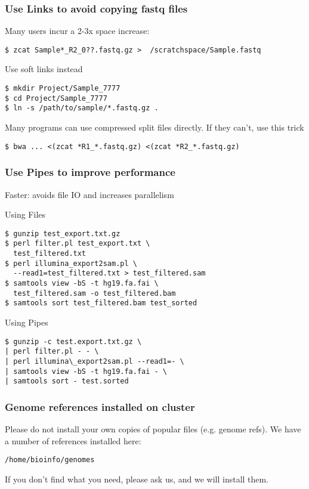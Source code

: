 \documentclass[10pt]{beamer}
\begin{document}
\begin{frame}[fragile]
\frametitle{Use Links to avoid copying fastq files}
Many users incur a 2-3x space increase:

\begin{verbatim}
$ zcat Sample*_R2_0??.fastq.gz >  /scratchspace/Sample.fastq
\end{verbatim}

Use soft links instead
\begin{verbatim}
$ mkdir Project/Sample_7777
$ cd Project/Sample_7777
$ ln -s /path/to/sample/*.fastq.gz .
\end{verbatim}

Many programs can use compressed split files directly.  If they can't, use this trick
\begin{verbatim}
$ bwa ... <(zcat *R1_*.fastq.gz) <(zcat *R2_*.fastq.gz) 
\end{verbatim}
\end{frame}

\begin{frame}[fragile]
\frametitle{Use Pipes to improve performance}

\vskip10pt
Faster: avoids file IO and increases parallelism

\vskip10pt
Using Files
\begin{verbatim}
$ gunzip test_export.txt.gz 
$ perl filter.pl test_export.txt \
  test_filtered.txt
$ perl illumina_export2sam.pl \
  --read1=test_filtered.txt > test_filtered.sam
$ samtools view -bS -t hg19.fa.fai \
  test_filtered.sam -o test_filtered.bam
$ samtools sort test_filtered.bam test_sorted
\end{verbatim}

Using Pipes
\begin{verbatim}
$ gunzip -c test.export.txt.gz \
| perl filter.pl - - \
| perl illumina\_export2sam.pl --read1=- \
| samtools view -bS -t hg19.fa.fai - \
| samtools sort - test.sorted
\end{verbatim}
\end{frame}

\begin{frame}[fragile]
\frametitle{Genome references installed on cluster}

Please do not install your own copies of popular files (e.g. genome refs).  
\vskip10pt
We have a number of references installed here:
\begin{verbatim}
/home/bioinfo/genomes
\end{verbatim}

If you don't find what you need, please ask us, and we will install them.

\end{frame}
\end{document}
